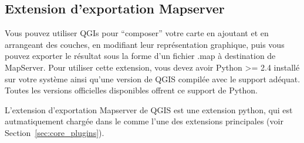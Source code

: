
%
%

\subsection{Extension d'exportation Mapserver}\label{sec:mapserver_export}

Vous pouvez utiliser QGIs pour ``composer'' votre carte en ajoutant et en arrangeant des couches, en modifiant leur repr\'esentation graphique, puis vous pouvez exporter le r\'esultat sous la forme d'un fichier .map \`a destination de MapServer. Pour utiliser cette extension, vous devez avoir Python >= 2.4 install\'e sur votre syst\`eme ainsi qu'une version de QGIS compil\'ee avec le support ad\'equat. Toutes les versions officielles disponibles offrent ce support de Python.

L'extension d'exportation Mapserver de QGIS \CURRENT est une extension python, qui est autmatiquement charg\'ee dans le  comme l'une des extensions principales (voir Section~\ref{sec:core_plugins}).

%

